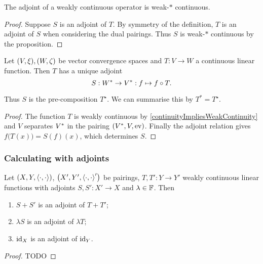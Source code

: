 \begin{corollary} \label{weak*continuityAdjoint}
The adjoint of a weakly continuous operator is weak-$*$ continuous.
\end{corollary}
\begin{proof}
Suppose $S$ is an adjoint of $T$. By symmetry of the definition, $T$ is an adjoint of $S$ when considering the dual pairings. Thus $S$ is weak-$*$ continuous by the proposition.
\end{proof}
\begin{corollary} \label{adjointContinuousFunction}
Let $\sSet{V,\xi}, \sSet{W,\zeta}$ be vector convergence spaces and $T: V\to W$ a continuous linear function. Then $T$ has a unique adjoint
\[ S: {W}^*\to {V}^*: f\mapsto f\circ T. \]
\end{corollary}
Thus $S$ is the pre-composition $T^\star$. We can summarise this by $T^* = T^\star$.
\begin{proof}
The function $T$ is weakly continuous by \ref{continuityImpliesWeakContinuity} and $V$ separates ${V}^*$ in the pairing $\sSet{\dual{V}, V, \evalMap}$. Finally the adjoint relation gives $f\big(T(x)\big) = S(f)(x)$, which determines $S$.
\end{proof}

\subsubsection{Calculating with adjoints}
\begin{proposition}
Let $\sSet{X,Y,\pair{\cdot,\cdot}}$, $\sSet{X',Y',\pair{\cdot,\cdot}'}$ be pairings, $T, T': Y\to Y'$ weakly continuous linear functions with adjoints $S, S': X'\to X$ and $\lambda\in \mathbb{F}$. Then
\begin{enumerate}
\item $S+S'$ is an adjoint of $T+T'$;
\item $\lambda S$ is an adjoint of $\lambda T$;
\item $\operatorname{id}_X$ is an adjoint of $\operatorname{id}_Y$.
\end{enumerate}
\end{proposition}
\begin{proof}
TODO
\end{proof}

